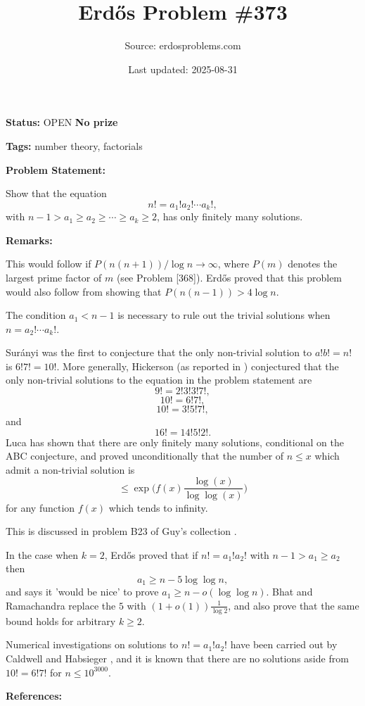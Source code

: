 \documentclass{article}
\title{Erd\H{o}s Problem \#373}
\date{Last updated: 2025-08-31}
\author{Source: erdosproblems.com}
\begin{document}
\maketitle

\noindent\textbf{Status:} OPEN \quad \textbf{No prize}

\noindent\textbf{Tags:} number theory, factorials

\medskip
\noindent\textbf{Problem Statement:}

Show that the equation\[n! = a_1!a_2!\cdots a_k!,\]with $n-1>a_1\geq a_2\geq \cdots \geq a_k\geq 2$, has only finitely many solutions.

\bigskip
\noindent\textbf{Remarks:}

This would follow if $P(n(n+1))/\log n\to \infty$, where $P(m)$ denotes the largest prime factor of $m$ (see Problem [368]). Erd\H{o}s \cite{Er76d} proved that this problem would also follow from showing that $P(n(n-1))>4\log n$.

The condition $a_1<n-1$ is necessary to rule out the trivial solutions when $n=a_2!\cdots a_k!$. 

Sur\'{a}nyi was the first to conjecture that the only non-trivial solution to $a!b!=n!$ is $6!7!=10!$. More generally, Hickerson (as reported in \cite{Er76d}) conjectured that the only non-trivial solutions to the equation in the problem statement are\[9!=2!3!3!7!,\]\[10!=6!7!,\]\[10!=3!5!7!,\]and\[16!=14!5!2!.\]Luca \cite{Lu07b} has shown that there are only finitely many solutions, conditional on the ABC conjecture, and proved unconditionally that the number of $n\leq x$ which admit a non-trivial solution is\[\leq \exp \bigg(f(x)\frac{\log (x)}{\log\log (x)}\bigg)\]for any function $f(x)$ which tends to infinity.

This is discussed in problem B23 of Guy's collection \cite{Gu04}.

In the case when $k=2$, Erd\H{o}s \cite{Er93} proved that if $n!=a_1!a_2!$ with $n-1>a_1\geq a_2$ then\[a_1\geq n-5\log\log n,\]and says it 'would be nice' to prove $a_1\geq n-o(\log\log n)$. Bhat and Ramachandra \cite{BhRa10} replace the $5$ with $(1+o(1))\frac{1}{\log 2}$, and also prove that the same bound holds for arbitrary $k\geq 2$.

Numerical investigations on solutions to $n!=a_1!a_2!$ have been carried out by Caldwell \cite{Ca94} and Habsieger \cite{Ha19}, and it is known that there are no solutions aside from $10!=6!7!$ for $n\leq 10^{3000}$.

\bigskip
\noindent\textbf{References:}
\end{document}
